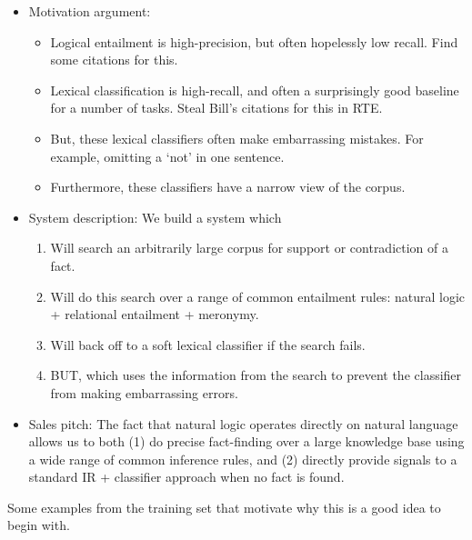 \begin{itemize}

\item Motivation argument:
  \begin{itemize}
    \item Logical entailment is high-precision, but often hopelessly low recall.
          Find some citations for this.
    \item Lexical classification is high-recall, and often a surprisingly good baseline
          for a number of tasks.
          Steal Bill's citations for this in RTE.
    \item But, these lexical classifiers often make embarrassing mistakes.
          For example, omitting a `not' in one sentence.
    \item Furthermore, these classifiers have a narrow view of the corpus.
  \end{itemize}

\item System description: We build a system which
  \begin{enumerate}
    \item Will search an arbitrarily large corpus for support or contradiction of
          a fact.
    \item Will do this search over a range of common entailment rules: natural
          logic + relational entailment + meronymy.
    \item Will back off to a soft lexical classifier if the search fails.
    \item BUT, which uses the information from the search to prevent the
          classifier from making embarrassing errors.
  \end{enumerate}

\item Sales pitch:
  The fact that natural logic operates directly on natural language allows us
  to both (1) do precise fact-finding over a large knowledge base using a
  wide range of common inference rules, and (2) directly provide signals to
  a standard IR + classifier approach when no fact is found.
\end{itemize}

Some examples from the training set that motivate why this is a good idea to begin
with.

